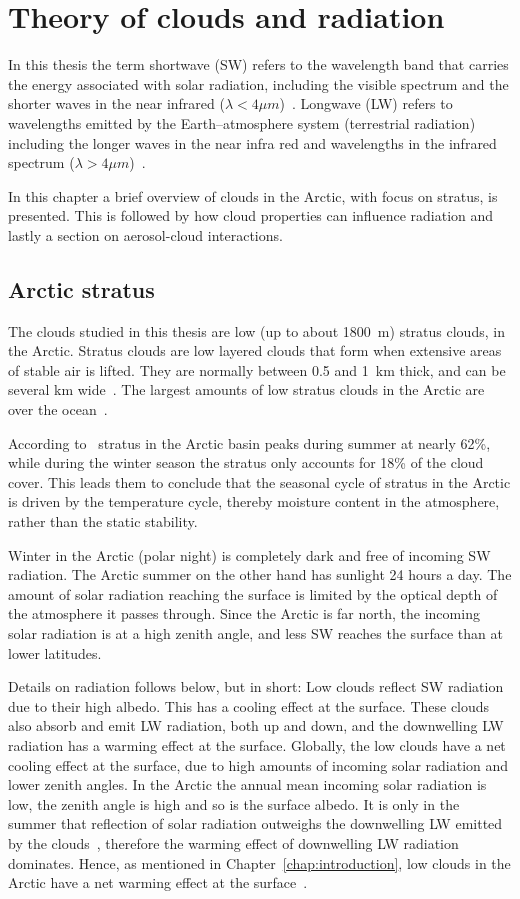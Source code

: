 \chapter{Theory of clouds and radiation}
\label{chap:theory}
In this thesis the term shortwave (SW) refers to the wavelength band that carries the energy associated with solar radiation, including the visible spectrum and the shorter waves in the near infrared ($\lambda < 4\mu m$)~\citep{Wallace2006}. Longwave (LW) refers to wavelengths emitted by the Earth--atmosphere system (terrestrial radiation) including the longer waves in the near infra red and wavelengths in the infrared spectrum ($\lambda > 4\mu m$)~\citep{Wallace2006}. 

In this chapter a brief overview of clouds in the Arctic, with focus on stratus, is presented. This is followed by how cloud properties can influence radiation and lastly a section on aerosol-cloud interactions.

\section{Arctic stratus}
The clouds studied in this thesis are low (up to about 1800~m) stratus clouds, in the Arctic. Stratus clouds are low layered clouds that form when extensive areas of stable air is lifted. They are normally between 0.5 and 1~km thick, and can be several km wide~\citep{Aguado2010}. The largest amounts of low stratus clouds in the Arctic are over the ocean~\citep{Klein1993}.

According to~\citet{Klein1993} stratus in the Arctic basin peaks during summer at nearly 62\%, while during the winter season the stratus only accounts for 18\% of the cloud cover. This leads them to conclude that the seasonal cycle of stratus in the Arctic is driven by the temperature cycle, thereby moisture content in the atmosphere, rather than the static stability.

Winter in the Arctic (polar night) is completely dark and free of incoming SW radiation. The Arctic summer on the other hand has sunlight 24 hours a day. The amount of solar radiation reaching the surface is limited by the optical depth of the atmosphere it passes through. Since the Arctic is far north, the incoming solar radiation is at a high zenith angle, and less SW reaches the surface than at lower latitudes.

Details on radiation follows below, but in short: Low clouds reflect SW radiation due to their high albedo. This has a cooling effect at the surface. These clouds also absorb and emit LW radiation, both up and down, and the downwelling LW radiation has a warming effect at the surface. Globally, the low clouds have a net cooling effect at the surface, due to high amounts of incoming solar radiation and lower zenith angles. In the Arctic the annual mean incoming solar radiation is low, the zenith angle is high and so is the surface albedo. It is only in the summer that reflection of solar radiation outweighs the downwelling LW emitted by the clouds~\citep{Curry1996}, therefore the warming effect of downwelling LW radiation dominates. Hence, as mentioned in Chapter~\ref{chap:introduction}, low clouds in the Arctic have a net warming effect at the surface~\citep{Shupe2004}.

